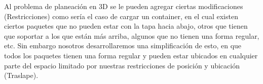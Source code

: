 Al problema de planeación en 3D se le pueden agregar ciertas modificaciones (Restricciones)
como sería el caso de cargar un container, en el cual existen ciertos paquetes que no
pueden estar con la tapa hacia abajo, otros que tienen que soportar a los que están más
arriba, algunos que no tienen una forma regular, etc. Sin embargo nosotros desarrollaremos
una simplificación de esto, en que todos los paquetes tienen una forma regular y pueden
estar ubicados en cualquier parte del espacio limitado por nuestras restricciones de
posición y ubicación (Traslape).
